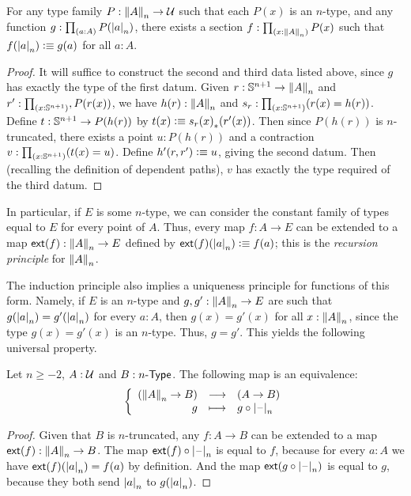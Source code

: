 \begin{thm}\label{thm:truncn-ind}
  For any type family $P:\trunc n A \to \type$ such that each $P(x)$ is an $n$-type, and any function $g : \prd{a:A} P(\tproj n a)$, there
exists a section $f:\prd{x:\trunc n A} P(x)$ such that $f(\tproj n a)\defeq g(a)$ for all $a:A$.
\end{thm}
\begin{proof}
  It will suffice to construct the second and third data listed above, since $g$ has exactly the type of the first datum.
  Given $r:\Sn^{n+1} \to \trunc n A$ and $r':\prd{x:\Sn^{n+1}}, P(r(x))$, we have $h(r):\trunc n A$ and $s_r :\prd{x:\Sn^{n+1}} (r(x) =
h(r))$.
  Define $t:\Sn^{n+1} \to P(h(r))$ by $t(x) \defeq \trans{s_r(x)}{r'(x)}$.
  Then since $P(h(r))$ is $n$-truncated, there exists a point $u:P(h(r))$ and a contraction $v:\prd{x:\Sn^{n+1}} (t(x) = u)$.
  Define $h'(r,r') \defeq u$, giving the second datum.
  Then (recalling the definition of dependent paths), $v$ has exactly the type required of the third datum.
\end{proof}

In particular, if $E$ is some $n$-type, we can consider the constant family of types equal to $E$ for every point of $A$.
%
Thus, every map $f:A\to{}E$ can be extended to a map $\extend{f}:\trunc nA\to{}E$ defined by $\extend{f}(\tproj na)\defeq f(a)$; this is the \emph{recursion principle} for $\trunc n A$.

The induction principle also implies a uniqueness principle for functions of this form.
%
Namely, if $E$ is an $n$-type and $g,g':\trunc nA\to{}E$ are such
that $g(\tproj na)=g'(\tproj na)$ for every $a:A$, then $g(x)=g'(x)$ for all $x:\trunc nA$, since the type $g(x)=g'(x)$ is an $n$-type.
Thus, $g=g'$.
This yields the following universal property.

\begin{lem}\label{thm:trunc-reflective}
  Let $n\ge-2$, $A:\type$ and $B:\typele{n}$. The following map is an
  equivalence:
  \[\function{(\trunc nA\to{}B)}{(A\to{}B)}{g}{g\circ\tprojf n}\]
\end{lem}

\begin{proof}
  Given that $B$ is $n$-truncated, any $f:A\to{}B$ can be extended to a map $\extend{f}:\trunc nA\to{}B$.
  The map $\extend{f}\circ\tprojf n$ is equal to $f$, because for every $a:A$ we have $\extend{f}(\tproj na)=f(a)$ by definition.
  And the map $\extend{g\circ\tprojf n}$ is equal to $g$, because they both send $\tproj na$ to $g(\tproj na)$.
\end{proof}

